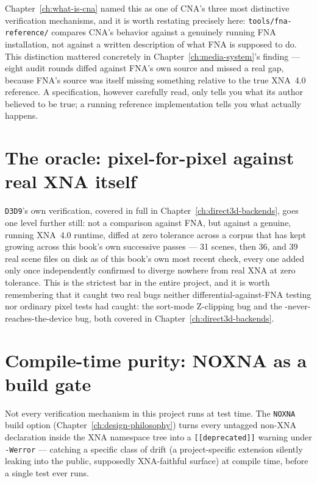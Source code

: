 Chapter~\ref{ch:what-is-cna} named this as one of CNA's three most distinctive verification
mechanisms, and it is worth restating precisely here: \texttt{tools/fna-reference/} compares
CNA's behavior against a genuinely running FNA installation, not against a written
description of what FNA is supposed to do. This distinction mattered concretely in
Chapter~\ref{ch:media-system}'s  finding --- eight audit rounds diffed against
FNA's own source and missed a real gap, because FNA's source was itself missing something
relative to the true XNA~4.0 reference. A specification, however carefully read, only tells
you what its author believed to be true; a running reference implementation tells you what
actually happens.

\section{The oracle: pixel-for-pixel against real XNA itself}

\texttt{D3D9}'s own verification, covered in full in Chapter~\ref{ch:direct3d-backends}, goes
one level further still: not a comparison against FNA, but against a genuine, running XNA~4.0
runtime, diffed at zero tolerance across a corpus that has kept growing across this book's own
successive passes --- 31 scenes, then 36, and 39 real scene files on disk as of this book's
own most recent check, every one added only once independently confirmed to diverge nowhere
from real XNA at zero tolerance. This is the strictest bar in the entire project, and it is
worth remembering that it caught two real bugs neither differential-against-FNA testing nor
ordinary pixel tests had caught: the sort-mode Z-clipping bug and the
-never-reaches-the-device bug, both covered in
Chapter~\ref{ch:direct3d-backends}.

\section{Compile-time purity: NOXNA as a build gate}

Not every verification mechanism in this project runs at test time. The \texttt{NOXNA} build
option (Chapter~\ref{ch:design-philosophy}) turns every untagged non-XNA declaration inside
the XNA namespace tree into a \texttt{[[deprecated]]} warning under \texttt{-Werror} ---
catching a specific class of drift (a project-specific extension silently leaking into the
public, supposedly XNA-faithful surface) at compile time, before a single test ever runs.

